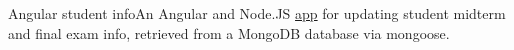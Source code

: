 \datedsubsectionnarrow{}
{Angular student info}{}{An Angular and Node.JS \href{https://github.com/jacobarchambault/angular-students}{app} for updating  student midterm and final exam info, retrieved from a  MongoDB database via mongoose.}